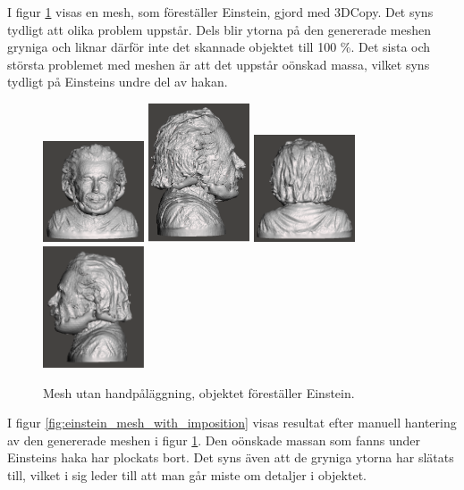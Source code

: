 I figur \ref{fig:einstein_mesh_without_imposition} visas en mesh, som föreställer Einstein, gjord med 3DCopy. Det syns tydligt att olika problem uppstår. Dels blir ytorna på den genererade meshen gryniga och liknar därför inte det skannade objektet till 100 \%. Det sista och största problemet med meshen är att det uppstår oönskad massa, vilket syns tydligt på Einsteins undre del av hakan.

\begin{figure}[H]
	\centering
	\includegraphics[width=30mm]{figures/ein_mesh_without_imposition1.png}
	\includegraphics[width=30mm]{figures/ein_mesh_without_imposition2.png}
	\includegraphics[width=30mm]{figures/ein_mesh_without_imposition3.png}
	\includegraphics[width=30mm]{figures/ein_mesh_without_imposition4.png}
	\caption{Mesh utan handpåläggning, objektet föreställer Einstein.}
	\label{fig:einstein_mesh_without_imposition}
\end{figure}

I figur \ref{fig:einstein_mesh_with_imposition} visas resultat efter manuell hantering av den genererade meshen i figur \ref{fig:einstein_mesh_without_imposition}. Den oönskade massan som fanns under Einsteins haka har plockats bort. Det syns även att de gryniga ytorna har slätats till, vilket i sig leder till att man går miste om detaljer i objektet.

